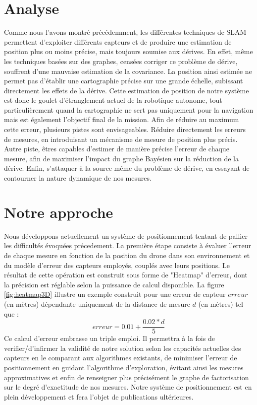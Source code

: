 \documentclass[twoside,twocolumn]{article}
\begin{document}

\section{Analyse}
Comme nous l'avons montré précédemment, les différentes techniques de SLAM permettent d'exploiter différents capteurs et de produire une estimation de position plus ou moins précise, mais toujours soumise aux dérives. En effet, même les techniques basées sur des graphes, censées corriger ce problème de dérive, souffrent d'une mauvaise estimation de la covariance. La position ainsi estimée ne permet pas d'établir une cartographie précise sur une grande échelle,
subissant directement les effets de la dérive. Cette estimation de position de notre système est donc le goulet d'étranglement actuel de la robotique autonome,
tout particulièrement quand la cartographie ne sert pas uniquement pour la navigation mais est également l'objectif final de la mission. Afin de réduire au maximum cette erreur, plusieurs pistes sont envisageables. Réduire directement les erreurs de mesures, en introduisant un mécanisme de mesure de position plus précis. Autre piste, êtres capables d'estimer de manière précise l'erreur de chaque mesure, afin de maximiser l'impact du graphe Bayésien sur la réduction de la dérive.
Enfin, s'attaquer à la source même du problème de dérive, en essayant de contourner la nature dynamique de nos mesures.

\section{Notre approche}
Nous développons actuellement un système de positionnement tentant de pallier les difficultés évoquées précedement. La première étape consiste à évaluer
l'erreur de chaque mesure en fonction de la position du drone dans son environnement et du modèle d'erreur des capteurs employés, couplés avec leurs positions. Le résultat de cette opération
est construit sous forme de "Heatmap" d'erreur, dont la précision est réglable selon la puissance de calcul disponible. La figure \ref{fig:heatmap3D} illustre un exemple construit pour une
erreur de capteur $erreur$ (en mètres) dépendante uniquement de la distance de mesure $d$ (en mètres) tel que :
\begin{equation} erreur = 0.01 + \frac{0.02*d}{5} \end{equation}
Ce calcul d'erreur embrasse un triple emploi. Il permettra à la fois de verifier/d'infirmer la validité de notre solution
selon les capacités actuelles des capteurs en le comparant aux algorithmes existants, de minimiser l'erreur de positionnement
en guidant l'algorithme d'exploration, évitant ainsi les mesures approximatives et enfin de renseigner plus précisément le graphe de factorisation sur le degré d'exactitude de nos mesures.
Notre système de positionnement est en plein développement et fera l'objet de publications ultérieures.
\end{document}
